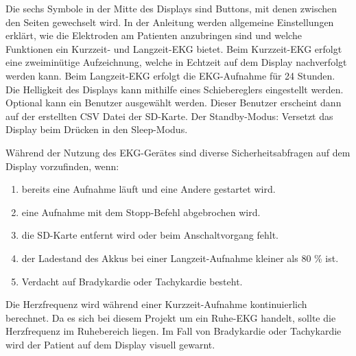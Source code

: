 Die sechs Symbole in der Mitte des Displays sind Buttons, mit denen zwischen den Seiten gewechselt wird. In der Anleitung werden allgemeine Einstellungen erklärt, wie die Elektroden am Patienten anzubringen sind und welche Funktionen ein Kurzzeit- und Langzeit-EKG bietet. Beim Kurzzeit-EKG erfolgt eine zweiminütige Aufzeichnung, welche in Echtzeit auf dem Display nachverfolgt werden kann. Beim Langzeit-EKG erfolgt die EKG-Aufnahme für 24 Stunden. Die Helligkeit des Displays kann mithilfe eines Schiebereglers eingestellt werden. Optional kann ein Benutzer ausgewählt werden. Dieser Benutzer erscheint dann auf der erstellten CSV Datei der SD-Karte. Der Standby-Modus: Versetzt das Display beim Drücken in den Sleep-Modus.

Während der Nutzung des EKG-Gerätes sind diverse Sicherheitsabfragen auf dem Display vorzufinden, wenn:
\begin{enumerate}
    \item bereits eine Aufnahme läuft und eine Andere gestartet wird.
    \item eine Aufnahme mit dem Stopp-Befehl abgebrochen wird.
    \item die SD-Karte entfernt wird oder beim Anschaltvorgang fehlt.
    \item der Ladestand des Akkus bei einer Langzeit-Aufnahme kleiner als 80 \% ist.
    \item Verdacht auf Bradykardie oder Tachykardie besteht.
\end{enumerate}

Die Herzfrequenz wird während einer Kurzzeit-Aufnahme kontinuierlich berechnet. Da es sich bei diesem Projekt um ein Ruhe-EKG handelt, sollte die Herzfrequenz im Ruhebereich liegen. Im Fall von Bradykardie oder Tachykardie wird der Patient auf dem Display visuell gewarnt.

